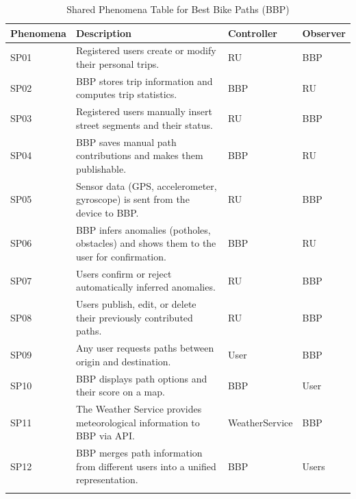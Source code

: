 \begin{longtable}{|l|p{}|l|l|}
    \hline
    \textbf{Phenomena} & \textbf{Description} & \textbf{Controller} & \textbf{Observer} \\
    \hline \hline

    SP01 & Registered users create or modify their personal trips. 
          & RU & BBP \\
    \hline

    SP02 & BBP stores trip information and computes trip statistics. 
          & BBP & RU \\
    \hline

    SP03 & Registered users manually insert street segments and their status. 
          & RU & BBP \\
    \hline

    SP04 & BBP saves manual path contributions and makes them publishable. 
          & BBP & RU \\
    \hline

    SP05 & Sensor data (GPS, accelerometer, gyroscope) is sent from the device to BBP. 
          & RU & BBP \\
    \hline

    SP06 & BBP infers anomalies (potholes, obstacles) and shows them to the user for confirmation. 
          & BBP & RU \\
    \hline

    SP07 & Users confirm or reject automatically inferred anomalies. 
          & RU & BBP \\
    \hline

    SP08 & Users publish, edit, or delete their previously contributed paths. 
          & RU & BBP \\
    \hline

    SP09 & Any user requests paths between origin and destination. 
          & User & BBP \\
    \hline

    SP10 & BBP displays path options and their score on a map. 
          & BBP & User \\
    \hline

    SP11 & The Weather Service provides meteorological information to BBP via API. 
          & WeatherService & BBP \\
    \hline

    SP12 & BBP merges path information from different users into a unified representation. 
          & BBP & Users \\
    \hline

    \caption{Shared Phenomena Table for Best Bike Paths (BBP)}

    \label{tab:shared-phenomena}
\end{longtable}


